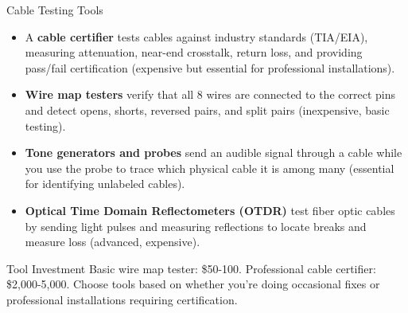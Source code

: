 \documentclass[aspectratio=169]{beamer}
\begin{document}
\begin{frame}{Cable Testing Tools}
    \begin{itemize}
        \item A \textbf{cable certifier} tests cables against industry standards (TIA/EIA), measuring attenuation, near-end crosstalk, return loss, and providing pass/fail certification (expensive but essential for professional installations).
        \item \textbf{Wire map testers} verify that all 8 wires are connected to the correct pins and detect opens, shorts, reversed pairs, and split pairs (inexpensive, basic testing).
        \item \textbf{Tone generators and probes} send an audible signal through a cable while you use the probe to trace which physical cable it is among many (essential for identifying unlabeled cables).
        \item \textbf{Optical Time Domain Reflectometers (OTDR)} test fiber optic cables by sending light pulses and measuring reflections to locate breaks and measure loss (advanced, expensive).
    \end{itemize}
    
    \vspace{0.3cm}
    \begin{block}{Tool Investment}
        Basic wire map tester: \$50-100. Professional cable certifier: \$2,000-5,000. Choose tools based on whether you're doing occasional fixes or professional installations requiring certification.
    \end{block}
\end{frame}
\end{document}
